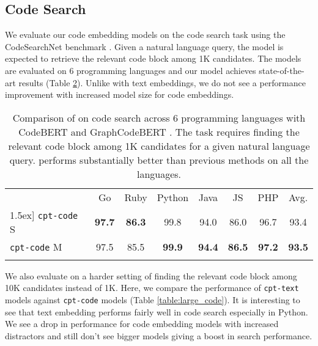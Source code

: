 \documentclass[nohyperref]{article}
\begin{document}
\begin{table}[]
\subsection{Code Search}
\label{sec:code}

We evaluate our code embedding models on the code search task using the CodeSearchNet benchmark \cite{codesearchnet}. Given a natural language query, the model is expected to retrieve the relevant code block among 1K candidates. The models are evaluated on 6 programming languages and our model achieves state-of-the-art results (Table \ref{table:code}). Unlike with text embeddings, we do not see a performance improvement with increased model size for code embeddings.

\begin{table}[]
\small
\setlength{\tabcolsep}{4pt}
\centering
\tabcolsep=0.105cm
\begin{tabular}{lccccccc}
& Go & Ruby & Python & Java & JS & PHP & Avg. \\
\Xhline{2.5\arrayrulewidth} \-1.5ex]
\texttt{cpt-code} S & \textbf{97.7} & \textbf{86.3} & 99.8 & 94.0 & 86.0 & 96.7 & 93.4 \\
\texttt{cpt-code} M & 97.5 & 85.5 & \textbf{99.9} & \textbf{94.4} & \textbf{86.5} & \textbf{97.2} & \textbf{93.5} \\
\Xhline{2.5\arrayrulewidth}
\end{tabular}
\caption{Comparison of  on code search across 6 programming languages \cite{codesearchnet} with CodeBERT \cite{codebert} and GraphCodeBERT \cite{Guo}. The task requires finding the relevant code block among 1K candidates for a given natural language query.  performs substantially better than previous methods on all the languages.}
\label{table:code}
\end{table}

We also evaluate on a harder setting of finding the relevant code block among 10K candidates instead of 1K. Here, we compare the performance of \texttt{cpt-text} models against \texttt{cpt-code} models (Table \ref{table:large_code}). It is interesting to see that text embedding performs fairly well in code search especially in Python. We see a drop in performance for code embedding models with increased distractors and still don’t see bigger models giving a boost in search performance. 


\end{table}
\end{document}
